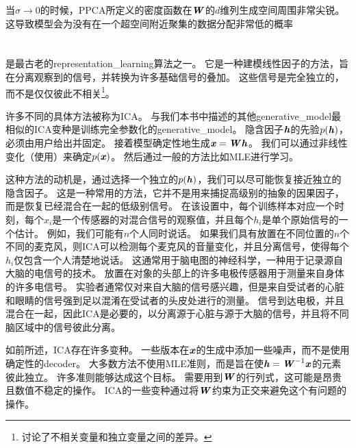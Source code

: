 当$\sigma\xrightarrow{} 0$的时候，\gls{PPCA}所定义的密度函数在$\boldsymbol{\mathit{W}}$的$d$维列生成空间周围非常尖锐。
这导致模型会为没有在一个超空间附近聚集的数据分配非常低的概率

\section{}
\label{sec:independent_component_analysis_ica}


是最古老的\gls{representation_learning}算法之一\citep{Herault+Ans-1984,Jutten+Herault-91,Comon94,Hyvarinen-1999,Hyvarinen-2001,Hinton-ICA-2001,Teh-2003}。
它是一种建模线性因子的方法，旨在分离观察到的信号，并转换为许多基础信号的叠加。
这些信号是完全独立的，而不是仅仅彼此不相关\footnote{讨论了不相关变量和独立变量之间的差异。}。


许多不同的具体方法被称为\gls{ICA}。
与我们本书中描述的其他\gls{generative_model}最相似的\gls{ICA}变种是训练完全参数化的\gls{generative_model}\citep{Pham-et-al-1992}。
隐含因子$\boldsymbol{\mathit{h}}$的先验$p(\boldsymbol{\mathit{h}})$，必须由用户给出并固定。
接着模型确定性地生成$\boldsymbol{\mathit{x}} = \boldsymbol{\mathit{W}} \boldsymbol{\mathit{h}}$。
我们可以通过非线性变化（使用）来确定$p(\boldsymbol{\mathit{x}})$。
然后通过一般的方法比如\gls{MLE}进行学习。


这种方法的动机是，通过选择一个独立的$p(\boldsymbol{\mathit{h}})$，我们可以尽可能恢复接近独立的隐含因子。
这是一种常用的方法，它并不是用来捕捉高级别的抽象的因果因子，而是恢复已经混合在一起的低级别信号。
在该设置中，每个训练样本对应一个时刻，每个$x_i$是一个传感器的对混合信号的观察值，并且每个$h_i$是单个原始信号的一个估计。
例如，我们可能有$n$个人同时说话。 
如果我们具有放置在不同位置的$n$个不同的麦克风，则\gls{ICA}可以检测每个麦克风的音量变化，并且分离信号，使得每个$h_i$仅包含一个人清楚地说话。
这通常用于脑电图的神经科学，一种用于记录源自大脑的电信号的技术。
放置在对象的头部上的许多电极传感器用于测量来自身体的许多电信号。
实验者通常仅对来自大脑的信号感兴趣，但是来自受试者的心脏和眼睛的信号强到足以混淆在受试者的头皮处进行的测量。
信号到达电极，并且混合在一起，因此\gls{ICA}是必要的，以分离源于心脏与源于大脑的信号，并且将不同脑区域中的信号彼此分离。


如前所述，\gls{ICA}存在许多变种。
一些版本在$\boldsymbol{\mathit{x}}$的生成中添加一些噪声，而不是使用确定性的\gls{decoder}。
大多数方法不使用\gls{MLE}准则，而是旨在使$\boldsymbol{\mathit{h}} = \boldsymbol{\mathit{W}}^{-1}\boldsymbol{\mathit{x}}$的元素彼此独立。
许多准则能够达成这个目标。
需要用到$\boldsymbol{\mathit{W}}$的行列式，这可能是昂贵且数值不稳定的操作。
\gls{ICA}的一些变种通过将$\boldsymbol{\mathit{W}}$约束为正交来避免这个有问题的操作。


